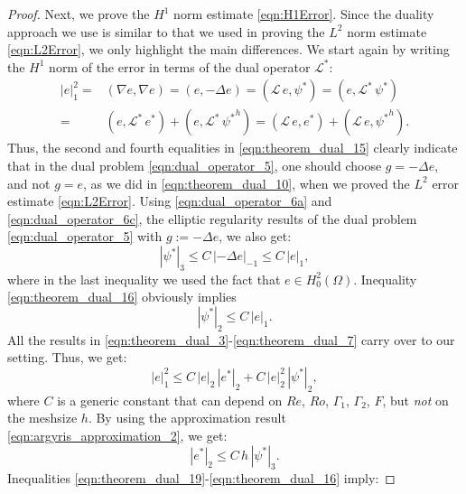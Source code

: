 \begin{proof}
  Next, we prove the $H^1$ norm estimate \eqref{eqn:H1Error}.  Since the duality
  approach we use is similar to that we used in proving the  $L^2$ norm estimate
  \eqref{eqn:L2Error}, we only highlight the main differences.  We start again
  by writing the $H^1$ norm of the error in terms of the dual operator
  $\mathcal{L}^*$:
  \begin{align}
    |e|_1^2 =& (\nabla e , \nabla e) = ( e , - \Delta e) =
      (\mathcal{L} \, e , \psi^*) = (e , \mathcal{L}^* \, \psi^*) \nonumber \\
    =& (e , \mathcal{L}^* \, e^*) + (e , \mathcal{L}^* \, {\psi^*}^h)
      = (\mathcal{L} \, e , e^*) + (\mathcal{L} \, e , {\psi^*}^h) .
    \label{eqn:theorem_dual_15}
  \end{align}
  Thus, the second and fourth equalities in \eqref{eqn:theorem_dual_15} clearly
  indicate that in the dual problem \eqref{eqn:dual_operator_5}, one should
  choose $g = - \Delta e$, and not $g = e$, as we did in
  \eqref{eqn:theorem_dual_10}, when we proved the $L^2$ error estimate
  \eqref{eqn:L2Error}.  Using \eqref{eqn:dual_operator_6a} and
  \eqref{eqn:dual_operator_6c}, the elliptic regularity results of the dual
  problem \eqref{eqn:dual_operator_5} with $g :=  - \Delta e$, we also get:
  \begin{equation}
    | \psi^* |_3 \leq C \, | - \Delta e |_{-1} \leq C \, | e |_1 ,
    \label{eqn:theorem_dual_16}
  \end{equation}
  where in the last inequality we used the fact that $e \in H_0^2(\Omega)$.
  Inequality \eqref{eqn:theorem_dual_16} obviously implies
  \begin{equation}
    | \psi^* |_2 \leq C \, | e |_1 .
    \label{eqn:theorem_dual_17}
  \end{equation}
  All the results in \eqref{eqn:theorem_dual_3}-\eqref{eqn:theorem_dual_7} carry
  over to our setting.  Thus, we get:
  \begin{equation}
    |e|_1^2 \leq C \, | e |_2 \, |e^* |_2 + C \, | e |_2^2 \, | \psi^* |_2 ,
    \label{eqn:theorem_dual_18}
  \end{equation}
  where $C$ is a generic constant that can depend on $Re$, $Ro$, $\Gamma_1$,
  $\Gamma_2$,  $F$, but \emph{not} on the meshsize $h$.  By using the
  approximation result \eqref{eqn:argyris_approximation_2}, we get:
  \begin{equation}
    |e^* |_2 \leq C \, h \, | \psi^* |_3 .
    \label{eqn:theorem_dual_19}
  \end{equation}
  Inequalities \eqref{eqn:theorem_dual_19}-\eqref{eqn:theorem_dual_16} imply:

\end{proof}
